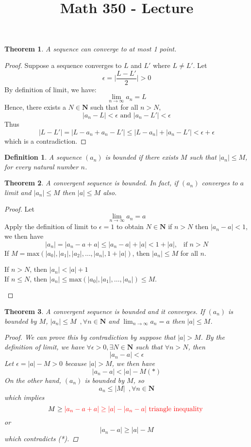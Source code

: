 \documentclass[10pt,letterpaper]{article}
\title{\textbf{{\color{orange}Math 350 - Lecture}}}
\newtheorem{thm}{Theorem}
\newtheorem{den}{Definition}
\begin{document}
\maketitle

\setlength{\parindent}{0pt}
\setlength{\parskip}{1ex}
	
	
	\begin{thm} A sequence can converge to at most 1 point.
	\end{thm}
	\begin{proof}
	Suppose a sequence converges to $L$ and $L'$ where $L \neq L'$. Let
	$$\epsilon = \bigg|\dfrac{L - L'}{2}| > 0$$
	By definition of limit, we have:
	$$\displaystyle\lim_{n\to\infty} a_n = L$$
	Hence, there exists a $N \in \mathbf{N}$ such that for all $n > N$, 
	$$|a_n - L| < \epsilon \text{ and } |a_n - L'| < \epsilon$$
	Thus 
	$$|L - L'| = |L - a_n + a_n - L'| \leq |L - a_n| + |a_n - L'| < \epsilon + \epsilon$$
	which is a contradiction.
	\end{proof}
	\begin{den}
		A sequence $(a_n)$ is bounded if there exists $M$ such that $|a_n| \leq M$, for every natural
		number $n$.	
	\end{den}
	\begin{thm}
		A convergent sequence is bounded. In fact, if $(a_n)$ converges to $a$ limit and $|a_n| \leq M$ then
		$|a| \leq M$ also.
	\end{thm}
	\begin{proof}
		Let $$\displaystyle\lim_{n\to\infty} a_n = a$$
		Apply the definition of limit to $\epsilon = 1$ to obtain $N \in \mathbf{N}$ if $n > N$ then
		$|a_n - a| < 1$, we then have
		$$|a_n| = |a_n - a + a| \leq |a_n - a| + |a| < 1 + |a|, \, \, \, \text{ if } n > N$$
		If $M = \mathrm{max}(|a_0|, |a_1|, |a_2|, \ldots , |a_n|, 1 + |a|)$, then
		$|a_n| \leq M$ for all $n$. \\
		\begin{center}
		If $n > N$, then $|a_n| < |a| + 1$ \\
		If $n \leq N$, then $|a_n| \leq \mathrm{max}(|a_0|, |a_1|, \ldots, |a_n|) \leq M$.
		\end{center}
	\end{proof}
	
	\begin{thm}
		A convergent sequence is bounded and it converges. If $(a_n)$ is bounded by $M$, $|a_n| \leq M \,\,\,, \forall n
		\in \mathbf{N}$
		and $\displaystyle\lim_{n\to\infty} a_n = a$ then $|a| \leq M$.
		\begin{proof}
		We can prove this by contradiction by suppose that $|a| > M$. By the definition of limit,
		we have $\forall \epsilon > 0, \exists N \in \mathbf{N}$ such that $\forall n > N$, then 
		$$|a_n - a| < \epsilon$$ 
		Let $\epsilon = |a| - M > 0$ because $|a| > M$, we then have
		$$|a_n - a| < |a| - M (*)$$
		On the other hand, $(a_n)$ is bounded by $M$, so 
		$$a_n \leq |M| \,\,\,, \forall n \in \mathbf{N}$$
		which implies
		$$M \geq {\color{red}|a_n - a + a| \geq |a| - |a_n - a| \text{ triangle inequality }}$$
		or $$|a_n - a| \geq |a| - M$$
		which contradicts (*).
		\end{proof}
	\end{thm}
	
\end{document}
